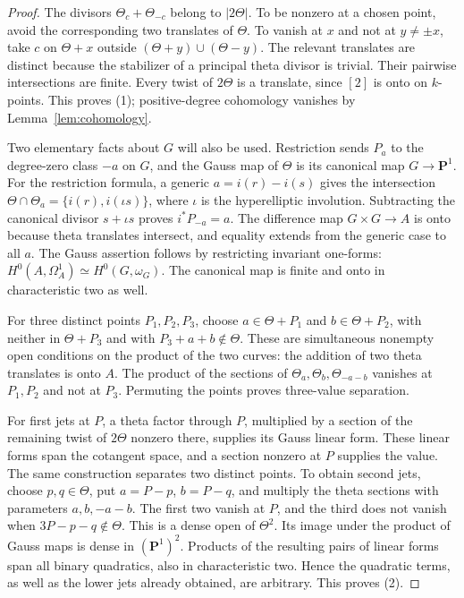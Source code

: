 \documentclass[11pt]{article}
\theoremstyle{definition}\newtheorem{definition}[theorem]{Definition}
\theoremstyle{remark}\newtheorem{remark}[theorem]{Remark}
\newcommand{\PP}{\mathbf P}
\begin{document}
\begin{proof}
The divisors $\Theta_c+\Theta_{-c}$ belong to $|2\Theta|$. To be nonzero at a chosen point, avoid the corresponding two translates of $\Theta$. To vanish at $x$ and not at $y\ne\pm x$, take $c$ on $\Theta+x$ outside $(\Theta+y)\cup(\Theta-y)$. The relevant translates are distinct because the stabilizer of a principal theta divisor is trivial. Their pairwise intersections are finite. Every twist of $2\Theta$ is a translate, since $[2]$ is onto on $k$-points. This proves (1); positive-degree cohomology vanishes by Lemma~\ref{lem:cohomology}.

Two elementary facts about $G$ will also be used. Restriction sends $P_a$ to the degree-zero class $-a$ on $G$, and the Gauss map of $\Theta$ is its canonical map $G\to\PP^1$. For the restriction formula, a generic $a=i(r)-i(s)$ gives the intersection $\Theta\cap\Theta_a=\{i(r),i(\iota s)\}$, where $\iota$ is the hyperelliptic involution. Subtracting the canonical divisor $s+\iota s$ proves $i^*P_{-a}=a$. The difference map $G\times G\to A$ is onto because theta translates intersect, and equality extends from the generic case to all $a$. The Gauss assertion follows by restricting invariant one-forms: $H^0(A,\Omega_A^1)\simeq H^0(G,\omega_G)$. The canonical map is finite and onto in characteristic two as well.

For three distinct points $P_1,P_2,P_3$, choose $a\in\Theta+P_1$ and $b\in\Theta+P_2$, with neither in $\Theta+P_3$ and with $P_3+a+b\notin\Theta$. These are simultaneous nonempty open conditions on the product of the two curves: the addition of two theta translates is onto $A$. The product of the sections of $\Theta_a,\Theta_b,\Theta_{-a-b}$ vanishes at $P_1,P_2$ and not at $P_3$. Permuting the points proves three-value separation.

For first jets at $P$, a theta factor through $P$, multiplied by a section of the remaining twist of $2\Theta$ nonzero there, supplies its Gauss linear form. These linear forms span the cotangent space, and a section nonzero at $P$ supplies the value. The same construction separates two distinct points. To obtain second jets, choose $p,q\in\Theta$, put $a=P-p$, $b=P-q$, and multiply the theta sections with parameters $a,b,-a-b$. The first two vanish at $P$, and the third does not vanish when $3P-p-q\notin\Theta$. This is a dense open of $\Theta^2$. Its image under the product of Gauss maps is dense in $(\PP^1)^2$. Products of the resulting pairs of linear forms span all binary quadratics, also in characteristic two. Hence the quadratic terms, as well as the lower jets already obtained, are arbitrary. This proves (2).


\end{proof}
\end{document}
